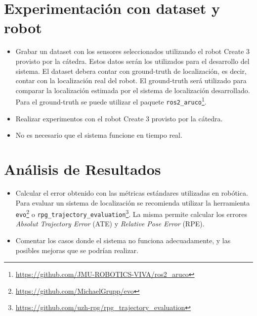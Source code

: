 \documentclass[tp]{lcc}
\begin{document}
	
	\section{Experimentación con dataset y robot}
	\begin{itemize}
		\item Grabar un dataset con los sensores seleccionados utilizando el robot Create 3 provisto por la cátedra. Estos datos serán los utilizados para el desarrollo del sistema. El dataset debera contar con ground-truth de localización, es decir, contar con la localización real del robot. El ground-truth será utilizado para comparar la localización estimada por el sistema de localización desarrollado. Para el ground-truth se puede utilizar el paquete \lstinline{ros2_aruco}\footnote{\url{https://github.com/JMU-ROBOTICS-VIVA/ros2_aruco}}. 
		
		\item Realizar experimentos con el robot Create 3 provisto por la cátedra.
		
		\item No es necesario que el sistema funcione en tiempo real.
	\end{itemize}
	
	
	\section{Análisis de Resultados}
		\begin{itemize}
			\item Calcular el error obtenido con las métricas estándares utilizadas en robótica. Para evaluar un sistema de localización se recomienda utilizar la herramienta \lstinline{evo}\footnote{\url{https://github.com/MichaelGrupp/evo}} o \lstinline{rpg_trajectory_evaluation}\footnote{\url{https://github.com/uzh-rpg/rpg_trajectory_evaluation}}. La misma permite calcular los errores \emph{Absolut Trajectory Error} (ATE) y \emph{Relative Pose Error} (RPE).
		
			\item Comentar los casos donde el sistema no funciona adecuadamente, y las posibles mejoras que se podrían realizar.
		\end{itemize}

	\printbibliography
	
\end{document}
